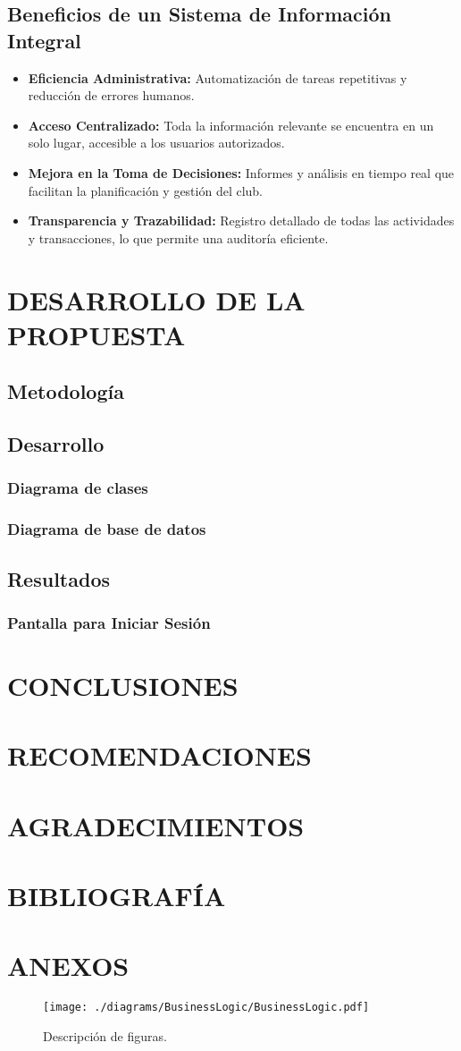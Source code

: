 \documentclass[stu, 12pt, letterpaper, donotrepeattitle, floatsintext, natbib]{apa7}
\begin{document}
\subsection{Beneficios de un Sistema de Informaci\'on Integral}
\begin{itemize}
    \item \textbf{Eficiencia Administrativa: }Automatizaci\'on de tareas repetitivas y reducci\'on de errores humanos.
    \item \textbf{Acceso Centralizado: }Toda la informaci\'on relevante se encuentra en un solo lugar, accesible a los usuarios autorizados.
    \item \textbf{Mejora en la Toma de Decisiones: }Informes y an\'alisis en tiempo real que facilitan la planificaci\'on y gestión del club.
    \item \textbf{Transparencia y Trazabilidad: }Registro detallado de todas las actividades y transacciones, lo que permite una auditor\'ia eficiente.
\end{itemize}

\section{\large DESARROLLO DE LA PROPUESTA}
\subsection{Metodolog\'ia}
\subsection{Desarrollo}
\subsubsection{Diagrama de clases}
\subsubsection{Diagrama de base de datos}
\subsection{Resultados}
\subsubsection{Pantalla para Iniciar Sesi\'on}
\section{\large CONCLUSIONES}
\section{\large RECOMENDACIONES}
\section{\large AGRADECIMIENTOS}
\section{\large BIBLIOGRAF\'IA}
\section{\large ANEXOS}
\begin{figure}
    \caption{Descripción de figuras.}
    \texttt{[image: ./diagrams/BusinessLogic/BusinessLogic.pdf]}
\end{figure}
\end{document}
